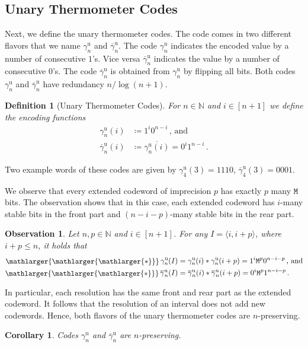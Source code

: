 \documentclass[9pt,journal,compsoc]{IEEEtran}
\newtheorem{corollary}[theorem]{Corollary}
\newtheorem{definition}[theorem]{Definition}
\newtheorem{observation}[theorem]{Observation}
\theoremstyle{remark}
\newcommand{\starr}{*}
\newcommand{\bigstarr}{\mathop{\raisebox{-.7pt}{\ensuremath{\mathlarger{\mathlarger{\mathlarger{*}}}}}}}
\newcommand{\mfu}{\mathtt{M}}
\newcommand{\IN}{\mathbb{N}}
\newcommand{\ang}[1]{\langle{#1}\rangle}
\newcommand{\intvl}[1]{\ang{#1}}
\newcommand{\gUnary}[1]{\gamma_{#1}^{\operatorname{u}}}
\newcommand{\gbUnary}[1]{\overline{\gamma}_{#1}^{\operatorname{u}}}
\begin{document}
\subsection{Unary Thermometer Codes}

Next, we define the unary thermometer codes.
The code comes in two different flavors that we name $\gUnary{n}$
  and $\gbUnary{n}$.
The code $\gUnary{n}$ indicates the encoded value by a number of consecutive $1$'s.
Vice versa $\gbUnary{n}$ indicates the value by a number of consecutive $0$'s.
The code $\gbUnary{n}$ is obtained from $\gUnary{n}$ by flipping all
  bits. 
Both codes $\gUnary{n}$ and $\gbUnary{n}$ have redundancy $n/\log(n+1)$.

\begin{definition}[Unary Thermometer Codes]\label{def:unary}
  For $n\in\IN$ and $i\in[n+1]$ we define the encoding functions 
 \begin{align*}
   \gUnary{n}(i)&\coloneqq 1^i 0^{n-i}\,\text{, and}\\
   \gbUnary{n}(i)&\coloneqq \overline{\gUnary{n}(i)} = 0^i 1^{n-i}\,.
 \end{align*}
\end{definition}

Two example words of these codes are given by
  $\gUnary{4}(3) = 1110$, $\gbUnary{4}(3) = 0001$.

We observe that every extended codeword of imprecision $p$ has exactly
  $p$ many $\mfu$ bits.
The observation shows that in this case, each extended codeword has $i$-many
  stable bits in the front part and $(n-i-p)$-many stable bits in the rear part.

\begin{observation}\label{obs:unarystarr}
  Let $n,p\in\IN$ and $i\in[n+1]$. For any $I=\intvl{i,i+p}$, where $i+p\leq n$,
  it holds that
  \begin{align*}
    \bigstarr\gUnary{n}(I)&=\gUnary{n}(i)\starr\gUnary{n}(i+p)=1^i \mfu^p 0^{n-i-p}\,\text{, and}\\
    \bigstarr\gbUnary{n}(I)&=\gbUnary{n}(i)\starr\gbUnary{n}(i+p)=0^i \mfu^p 1^{n-i-p}\,.
  \end{align*}
\end{observation}

In particular, each resolution has the same front and rear part as the extended 
  codeword.
It follows that the resolution of an interval does not add new codewords.
Hence, both flavors of the unary thermometer codes are $n$-preserving.

\begin{corollary}\label{col:unarypreserv}
  Codes $\gUnary{n}$ and $\gbUnary{n}$ are $n$-preserving.
\end{corollary}
\end{document}

